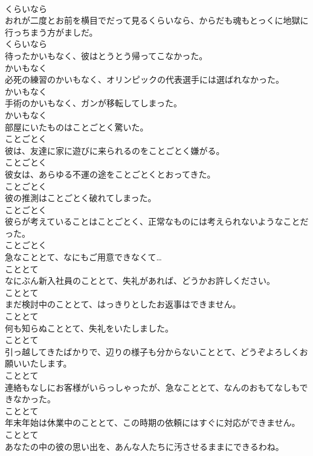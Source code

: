 \documentclass[8pt]{extreport}
\begin{document}
\begin{CJK}{UTF8}{min}
\\	くらいなら
\\	おれが二度とお前を横目でだって見るくらいなら、からだも魂もとっくに地獄に行っちまう方がましだ。	
\\	くらいなら
\\	待ったかいもなく、彼はとうとう帰ってこなかった。	
\\	かいもなく
\\	必死の練習のかいもなく、オリンピックの代表選手には選ばれなかった。	
\\	かいもなく
\\	手術のかいもなく、ガンが移転してしまった。	
\\	かいもなく
\\	部屋にいたものはことごとく驚いた。	
\\	ことごとく
\\	彼は、友達に家に遊びに来られるのをことごとく嫌がる。	
\\	ことごとく
\\	彼女は、あらゆる不運の途をことごとくとおってきた。	
\\	ことごとく
\\	彼の推測はことごとく破れてしまった。	
\\	ことごとく
\\	彼らが考えていることはことごとく、正常なものには考えられないようなことだった。	
\\	ことごとく
\\	急なこととて、なにもご用意できなくて…	
\\	こととて
\\	なにぶん新入社員のこととて、失礼があれば、どうかお許しください。	
\\	こととて
\\	まだ検討中のこととて、はっきりとしたお返事はできません。	
\\	こととて
\\	何も知らぬこととて、失礼をいたしました。	
\\	こととて
\\	引っ越してきたばかりで、辺りの様子も分からないこととて、どうぞよろしくお願いいたします。	
\\	こととて
\\	連絡もなしにお客様がいらっしゃったが、急なこととて、なんのおもてなしもできなかった。	
\\	こととて
\\	年末年始は休業中のこととて、この時期の依頼にはすぐに対応ができません。	
\\	こととて
\\	あなたの中の彼の思い出を、あんな人たちに汚させるままにできるわね。	

\end{CJK}
\end{document}
